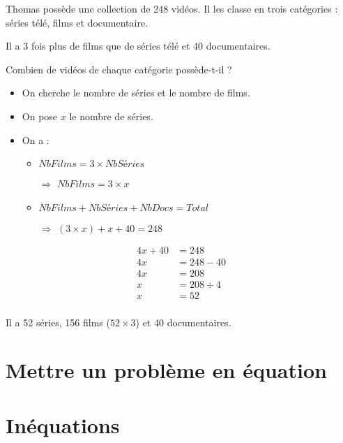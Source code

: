 \documentclass[12pt,a4paper]{article}
\begin{document}
\begin{myact}{4}
	Thomas possède une collection de 248 vidéos. Il les classe en trois catégories : séries télé, films et documentaire.
	
	Il a 3 fois plus de films que de séries télé et 40 documentaires.
	
	Combien de vidéos de chaque catégorie possède-t-il ?
	
\end{myact}

\begin{myrep}
\begin{itemize}
	\item On cherche le nombre de séries et le nombre de films.
	\item On pose $x$ le nombre de séries.
	\item On a :
		\begin{itemize}
			\item $NbFilms = 3 \times NbSéries$
			\item[$\Rightarrow$] $NbFilms = 3 \times x$
			\item $NbFilms + NbSéries + NbDocs = Total$
			\item[$\Rightarrow$] $(3 \times x) + x + 40 = 248$
		\end{itemize} 
\end{itemize}

\begin{align*}
	4x + 40 &= 248\\
	4x &= 248 - 40 \\
	4x &= 208 \\
	x &= 208 \div 4 \\
	x &= 52 \\
\end{align*}

Il a 52 séries, 156 films ($52 \times 3$) et 40 documentaires. 
\end{myrep}
	
%
%
%
%		
%		
%	

\section{Mettre un problème en équation}



\section{Inéquations}
\end{document}
